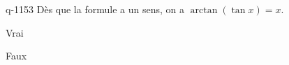 \begin{truefalse}{q-1153}
Dès que la formule a un sens, on a $\arctan(\tan x) = x$.
\item Vrai
\item* Faux
\end{truefalse}

